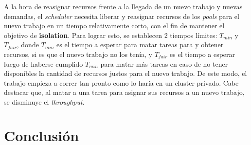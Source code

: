 \documentclass[a4paper]{article}
\begin{document}
A la hora de reasignar recursos frente a la llegada de un nuevo trabajo y nuevas demandas, el \textit{scheduler} necesita liberar y reasignar recursos de los \textit{pools} para el nuevo trabajo en un tiempo relativamente corto, con el fin de mantener el objetivo de \textbf{isolation}. Para lograr esto, se establecen 2 tiempos límites: $T_{min}$ y $T_{fair}$, donde $T_{min}$ es el tiempo a esperar para matar tareas para y obtener recursos, si es que el nuevo trabajo no los tenía, y $T_{fair}$ es el tiempo a esperar luego de haberse cumplido $T_{min}$ para matar más tareas en caso de no tener disponibles la cantidad de recursos justos para el nuevo trabajo. De este modo, el trabajo empieza a correr tan pronto como lo haría en un cluster privado. Cabe destacar que, al matar a una tarea para asignar sus recursos a un nuevo trabajo, se disminuye el \textit{throughput}.



\newpage
\section{Conclusión}
\end{document}
